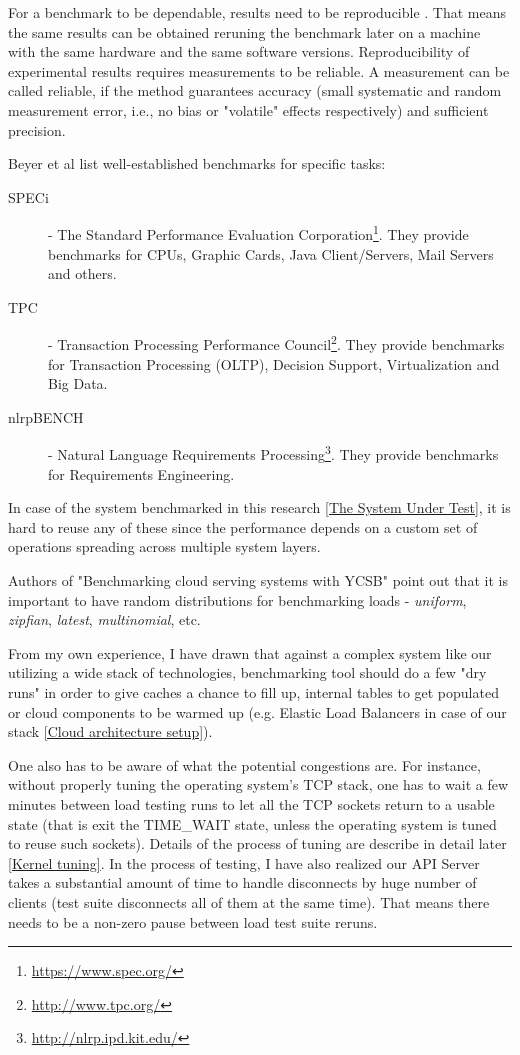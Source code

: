\documentclass{uvamscse}
\begin{document}
For a benchmark to be dependable, results need to be reproducible \cite{BornBen}. That means the same results can be obtained reruning the benchmark later on a machine with the same hardware and the same software versions. Reproducibility of experimental results requires measurements to be reliable. A measurement can be called reliable, if the method guarantees accuracy (small systematic and random measurement error, i.e., no bias or "volatile" effects respectively) and sufficient precision.

Beyer et al \cite{BenRM} list well-established benchmarks for specific tasks:
\begin{description}
  \item[SPECi]
  - The Standard Performance Evaluation Corporation\footnote{\url{https://www.spec.org/}}. They provide benchmarks for CPUs, Graphic Cards, Java Client/Servers, Mail Servers and others.
  \item[TPC]
  - Transaction Processing Performance Council\footnote{\url{http://www.tpc.org/}}. They provide benchmarks for Transaction Processing (OLTP), Decision Support, Virtualization and Big Data.
  \item[nlrpBENCH]
  - Natural Language Requirements Processing\footnote{\url{http://nlrp.ipd.kit.edu/}}. They provide benchmarks for Requirements Engineering.
\end{description}

In case of the system benchmarked in this research \ref{The System Under Test}, it is hard to reuse any of these since the performance depends on a custom set of operations spreading across multiple system layers.

Authors of "Benchmarking cloud serving systems with YCSB" \cite{Ycsb} point out that it is important to have random distributions for benchmarking loads - \textit{uniform}, \textit{zipfian}, \textit{latest}, \textit{multinomial}, etc.

From my own experience, I have drawn that against a complex system like our utilizing a wide stack of technologies, benchmarking tool should do a few "dry runs" in order to give caches a chance to fill up, internal tables to get populated or cloud components to be warmed up (e.g. Elastic Load Balancers in case of our stack \ref{Cloud architecture setup}).

One also has to be aware of what the potential congestions are. For instance, without properly tuning the operating system's TCP stack, one has to wait a few minutes between load testing runs to let all the TCP sockets return to a usable state (that is exit the TIME\_WAIT state, unless the operating system is tuned to reuse such sockets). Details of the process of tuning are describe in detail later \ref{Kernel tuning}. In the process of testing, I have also realized our API Server takes a substantial amount of time to handle disconnects by huge number of clients (test suite disconnects all of them at the same time). That means there needs to be a non-zero pause between load test suite reruns.
\end{document}
